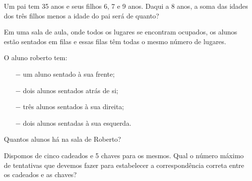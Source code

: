 	\item Um pai tem 35 anos e seus filhos 6, 7 e 9 anos. Daqui a 8 anos, a soma das idades dos três filhos menos a idade do pai será de quanto?

	\item Em uma sala de aula, onde todos os lugares se encontram ocupados, os alunos estão sentados em filas e essas filas têm todas o mesmo número de lugares.
	
	O aluno roberto tem:
	\begin{enumerate}
		\item[$-$]um aluno sentado à sua frente;
		\item[$-$]dois alunos sentados atrás de si;
		\item[$-$]três alunos sentados à sua direita;
		\item[$-$]dois alunos sentadas à sua esquerda.
	\end{enumerate}
	Quantos alunos há na sala de Roberto?	

	\item Dispomos de cinco cadeados e 5 chaves para os mesmos. Qual o número máximo de tentativas que devemos fazer para estabelecer a correspondência correta entre os cadeados e as chaves?
